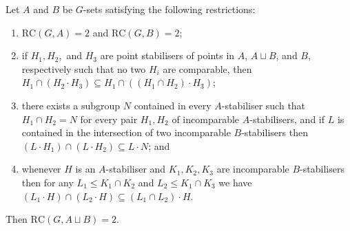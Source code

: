 \documentclass[11pt, a4paper]{amsart}
\begin{document}
\begin{lemma}\label{lem:intransconditions2}
    Let $A$ and $B$ be $G$-sets satisfying the following restrictions:\begin{enumerate}
        \item[1.] $\mathrm{RC}(G,A)=2$ and $\mathrm{RC}(G,B)=2$;
        \item[2.] if $H_1, H_2,$ and $H_3$ are point stabilisers of points in $A$, $A\sqcup B$, and $B$, respectively such that no two $H_i$ are comparable, then $H_1\cap (H_2\cdot H_3)\subseteq H_1\cap((H_1\cap H_2)\cdot H_3)$;
        \item[3.] there exists a subgroup $N$ contained in every $A$-stabiliser such that $H_1\cap H_2=N$ for every pair $H_1,H_2$ of incomparable $A$-stabilisers, and if $L$ is contained in the intersection of two incomparable $B$-stabilisers then $(L\cdot H_1)\cap (L\cdot H_2)\subseteq L\cdot N$; and
        \item[4.] whenever $H$ is an $A$-stabiliser and $K_1,K_2,K_3$ are incomparable $B$-stabilisers         then for any $L_1\leq K_1\cap K_2$ and $L_2\leq K_1\cap K_3$ we have $(L_1\cdot H) \cap (L_2\cdot H)\subseteq (L_1\cap L_2)\cdot H$.
    \end{enumerate}
    Then $\mathrm{RC}(G,A\sqcup B)=2$.
\end{lemma}
\end{document}
